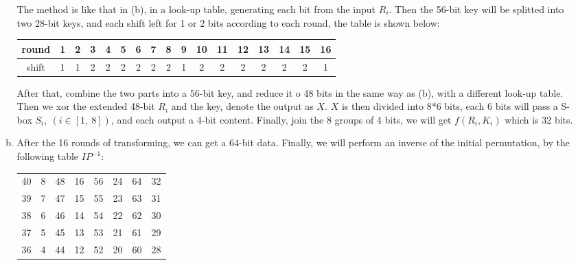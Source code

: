\documentclass[12pt, a4paper]{article}
\begin{document}
\begin{enumerate}
\begin{enumerate}[a)]
                        The method is like that in (b), in a look-up table, generating each bit from the input $R_i$.\newline
                        Then the 56-bit key will be splitted into two 28-bit keys, and each shift left for 1 or 2 bits according to 
                        each round, the table is shown below:
                        \begin{center}
                              \begin{tabular}{c|cccccccccccccccc}
                                    round & 1 & 2 & 3 & 4 & 5 & 6 & 7 & 8 & 9 & 10 & 11 & 12 & 13 & 14 & 15 & 16\\
                                    \hline
                                    shift & 1 & 1 & 2 & 2 & 2 & 2 & 2 & 2 & 1 & 2  & 2  & 2  & 2  & 2  & 2  & 1
                              \end{tabular}
                        \end{center}
                        After that, combine the two parts into a 56-bit key, and reduce it o 48 bits in the same way as (b), 
                        with a different look-up table.\newline
                        Then we xor the extended 48-bit $R_i$ and the key, denote the output as $X$. $X$ is then divided into 
                        8*6 bits, each 6 bits will pass a S-box $S_i,\ (i \in [1,\ 8])$, and each output a 4-bit content.\newline
                        Finally, join the 8 groups of 4 bits, we will get $f(R_i, K_i)$ which is 32 bits.
                  \item After the 16 rounds of transforming, we can get a 64-bit data. Finally, we will perform an inverse of 
                        the initial permutation, by the following table \textbf{\emph{$IP^{-1}$}}:
                        \begin{center}
                              \begin{tabular}{cccccccc}
                                    40 & 8 & 48 & 16 & 56 & 24 & 64 & 32\\
                                    39 & 7 & 47 & 15 & 55 & 23 & 63 & 31\\
                                    38 & 6 & 46 & 14 & 54 & 22 & 62 & 30\\
                                    37 & 5 & 45 & 13 & 53 & 21 & 61 & 29\\
                                    36 & 4 & 44 & 12 & 52 & 20 & 60 & 28\\

\end{tabular}
\end{center}
\end{enumerate}
\end{enumerate}
\end{document}
